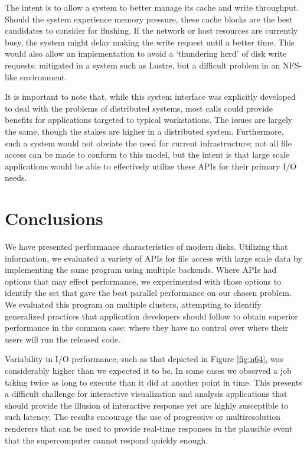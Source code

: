 The intent is to allow a system to better manage its cache and write
throughput.  Should the system experience memory pressure, these cache
blocks are the best candidates to consider for flushing.  If the
network or host resources are currently busy, the system might delay
making the write request until a better time.  This would also allow
an implementation to avoid a `thundering herd' of disk write requests:
mitigated in a system such as Lustre, but a difficult problem in an
NFS-like environment.

It is important to note that, while this system interface was
explicitly developed to deal with the problems of distributed systems,
most calls could provide benefits for applications targeted to typical
workstations.  The issues are largely the same, though the stakes are
higher in a distributed system.  Furthermore, such a system would not
obviate the need for current infrastructure; not all file access can
be made to conform to this model, but the intent is that large scale
applications would be able to effectively utilize these APIs for their
primary I/O needs.

\section{Conclusions}\label{sec:io-conclusions}

We have presented performance characteristics of modern disks.
Utilizing that information, we evaluated a variety of APIs for
file access with large scale data by implementing the same program
using multiple backends.  Where APIs had options that may effect
performance, we experimented with those options to identify the set that
gave the best parallel performance on our chosen problem.  We evaluated
this program on multiple clusters, attempting to identify generalized
practices that application developers should follow to obtain superior
performance in the common case: where they have no control over where
their users will run the released code.

Variability in I/O performance, such as that depicted in Figure
\ref{fig:n64}, was considerably higher than we expected it to be.  In
some cases we observed a job taking twice as long to execute than it
did at another point in time.  This presents a difficult challenge
for interactive visualization and analysis applications that should
provide the illusion of interactive response yet are highly susceptible
to such latency.  The results encourage the use of progressive or
multiresolution renderers that can be used to provide real-time
responses in the plausible event that the supercomputer cannot respond
quickly enough.

